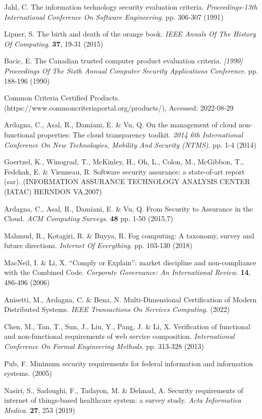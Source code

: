 Jahl, C. The information technology security evaluation criteria. {\em Proceedings-13th International Conference On Software Engineering}. pp. 306-307 (1991)

Lipner, S. The birth and death of the orange book. {\em IEEE Annals Of The History Of Computing}. \textbf{37}, 19-31 (2015)

Bacic, E. The Canadian trusted computer product evaluation criteria. {\em [1990] Proceedings Of The Sixth Annual Computer Security Applications Conference}. pp. 188-196 (1990)

Common Criteria Certified Products. (https://www.commoncriteriaportal.org/products/), Accessed: 2022-08-29

Ardagna, C., Asal, R., Damiani, E. \& Vu, Q. On the management of cloud non-functional properties: The cloud transparency toolkit. {\em 2014 6th International Conference On New Technologies, Mobility And Security (NTMS)}. pp. 1-4 (2014)

Goertzel, K., Winograd, T., McKinley, H., Oh, L., Colon, M., McGibbon, T., Fedchak, E. \& Vienneau, R. Software security assurance: a state-of-art report (sar). (INFORMATION ASSURANCE TECHNOLOGY ANALYSIS CENTER (IATAC) HERNDON VA,2007)

Ardagna, C., Asal, R., Damiani, E. \& Vu, Q. From Security to Assurance in the Cloud. {\em ACM Computing Surveys}. \textbf{48} pp. 1-50 (2015,7)

Mahmud, R., Kotagiri, R. \& Buyya, R. Fog computing: A taxonomy, survey and future directions. {\em Internet Of Everything}. pp. 103-130 (2018)

MacNeil, I. \& Li, X. “Comply or Explain”: market discipline and non-compliance with the Combined Code. {\em Corporate Governance: An International Review}. \textbf{14}, 486-496 (2006)

Anisetti, M., Ardagna, C. \& Bena, N. Multi-Dimensional Certification of Modern Distributed Systems. {\em IEEE Transactions On Services Computing}. (2022)

Chen, M., Tan, T., Sun, J., Liu, Y., Pang, J. \& Li, X. Verification of functional and non-functional requirements of web service composition. {\em International Conference On Formal Engineering Methods}. pp. 313-328 (2013)

Pub, F. Minimum security requirements for federal information and information systems.  (2005)

Nasiri, S., Sadoughi, F., Tadayon, M. \& Dehnad, A. Security requirements of internet of things-based healthcare system: a survey study. {\em Acta Informatica Medica}. \textbf{27}, 253 (2019)
